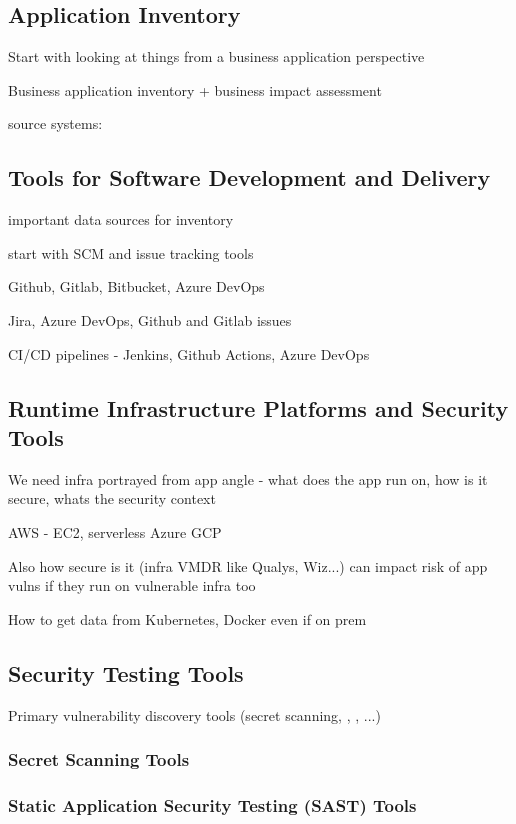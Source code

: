 \subsection{Application Inventory}

Start with looking at things from a business application perspective

Business application inventory + business impact assessment

source systems: 

\subsection{Tools for Software Development and Delivery}

important data sources for inventory

start with SCM and issue tracking tools

Github, Gitlab, Bitbucket, Azure DevOps

Jira, Azure DevOps, Github and Gitlab issues

CI/CD pipelines - Jenkins, Github Actions, Azure DevOps

\subsection{Runtime Infrastructure Platforms and Security Tools}

We need infra portrayed from app angle - what does the app run on, how is it secure, whats the security context

AWS - EC2, serverless
Azure
GCP

Also how secure is it (infra VMDR like Qualys, Wiz...) can impact risk of app vulns if they run on vulnerable infra too

How to get data from Kubernetes, Docker even if on prem

\subsection{Security Testing Tools}

Primary vulnerability discovery tools (secret scanning, , , ...)

\subsubsection{Secret Scanning Tools}

\subsubsection{Static Application Security Testing (SAST) Tools}

